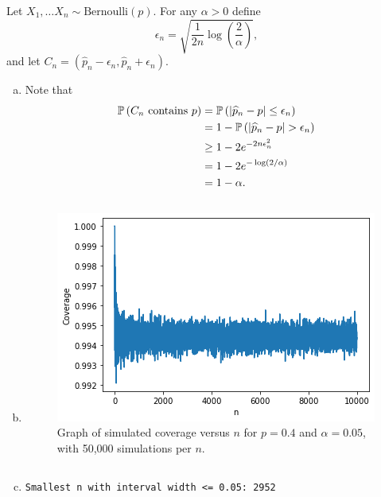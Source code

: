 \begin{ex}
  Let $X_1,\ldots X_n\sim\text{Bernoulli}(p)$. For any $\alpha>0$ define
  \[
    \epsilon_n=\sqrt{\frac{1}{2n}\log\left(\frac{2}{\alpha}\right)},
  \]
  and let $C_n=(\widehat{p}_n-\epsilon_n, \widehat{p}_n+\epsilon_n)$.
  \begin{enumerate}[(a)]
    \item Note that
          \begin{align*}
            \P{C_n\text{ contains } p}
             & =\P{|\widehat{p}_n-p|\leq \epsilon_n} \\
             & =1-\P{|\widehat{p}_n-p|> \epsilon_n}  \\
             & \geq 1-2e^{-2n\epsilon_n^2}           \\
             & =1-2e^{-\log(2/\alpha)}               \\
             & =1 - \alpha.
          \end{align*}
    \item
          \inputminted{python}{src/04-04b.py}

          \begin{figure}[H]
            \centering
            \includegraphics[scale=0.7]{part1/ch04-04b}
            \caption{Graph of simulated coverage versus $n$ for $p=0.4$ and
              $\alpha=0.05$, with 50,000 simulations per $n$.}
          \end{figure}
    \item
          \inputminted{python}{src/04-04c.py}

          \begin{verbatim}
Smallest n with interval width <= 0.05: 2952
          \end{verbatim}


\end{enumerate}
\end{ex}
